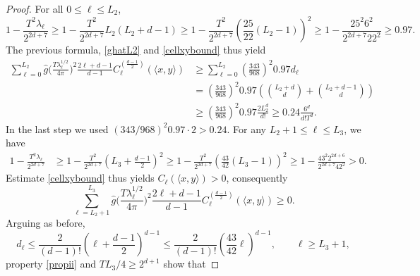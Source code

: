 \documentclass[11pt,a4paper]{article}
\theoremstyle{definition}
\begin{document}
\begin{proof}
For all $0 \le \ell \le L_2$,
\[ 1-\frac{T^2 \lambda_{\ell}}{2^{2d+7}} \ge 1-\frac{T^2}{2^{2d+7}} L_2 (L_2+d-1) \ge 1-\frac{T^2}{2^{2d+7}} \left(\frac{25}{22}(L_2-1) \right)^2 \ge 1- \frac{25^2 6^2}{2^{2d+7}22^2} \ge 0.97. \]
The previous formula, \eqref{ghatL2} and \eqref{cellxybound} thus yield
\begin{equation}\label{firstsum}
\begin{split} \sum_{\ell=0}^{L_2} \widehat{g}\bigg( \frac{T \lambda_{\ell}^{1/2}}{4 \pi} \bigg)^2 \frac{2\ell+d-1}{d-1} C_{\ell}^{(\frac{d-1}{2})}(\langle x, y \rangle) &\ge \sum_{\ell=0}^{L_2} \left( \frac{343}{968} \right)^2 0.97 d_{\ell} \\ &= \left( \frac{343}{968} \right)^2 0.97 \left( \binom{L_2+d}{d} + \binom{L_2+d-1}{d} \right) \\ &\ge \left( \frac{343}{968} \right)^2 0.97 \frac{2 L_2^d}{d!} \ge 0.24 \frac{6^d}{d! T^d} . \end{split}
\end{equation}
In the last step we used $(343/968)^2 0.97 \cdot 2>0.24$. For any $L_2+1 \le \ell \le L_3$, we have
\[ \begin{split} 1 - \frac{T^2 \lambda_{\ell}}{2^{2d+7}} &\ge 1-\frac{T^2}{2^{2d+7}} \left( L_3 +\frac{d-1}{2} \right)^2 \ge 1-\frac{T^2}{2^{2d+7}} \left( \frac{43}{42} (L_3-1) \right)^2 \ge 1-\frac{43^2 2^{2d+6}}{2^{2d+7} 42^2} >0. \end{split} \]
Estimate \eqref{cellxybound} thus yields $C_{\ell}(\langle x, y  \rangle) >0$, consequently
\begin{equation}\label{secondsum}
\sum_{\ell=L_2+1}^{L_3} \widehat{g}\bigg( \frac{T \lambda_{\ell}^{1/2}}{4 \pi} \bigg)^2 \frac{2\ell+d-1}{d-1} C_{\ell}^{(\frac{d-1}{2})}(\langle x, y \rangle) \ge 0.
\end{equation}
Arguing as before,
\[ d_{\ell} \le \frac{2}{(d-1)!} \left( \ell+\frac{d-1}{2} \right)^{d-1} \le \frac{2}{(d-1)!} \left( \frac{43}{42} \ell \right)^{d-1}, \qquad \ell \ge L_3+1, \]
property \eqref{propii} and $TL_3 /4 \ge 2^{d+1}$ show that

\end{proof}
\end{document}
